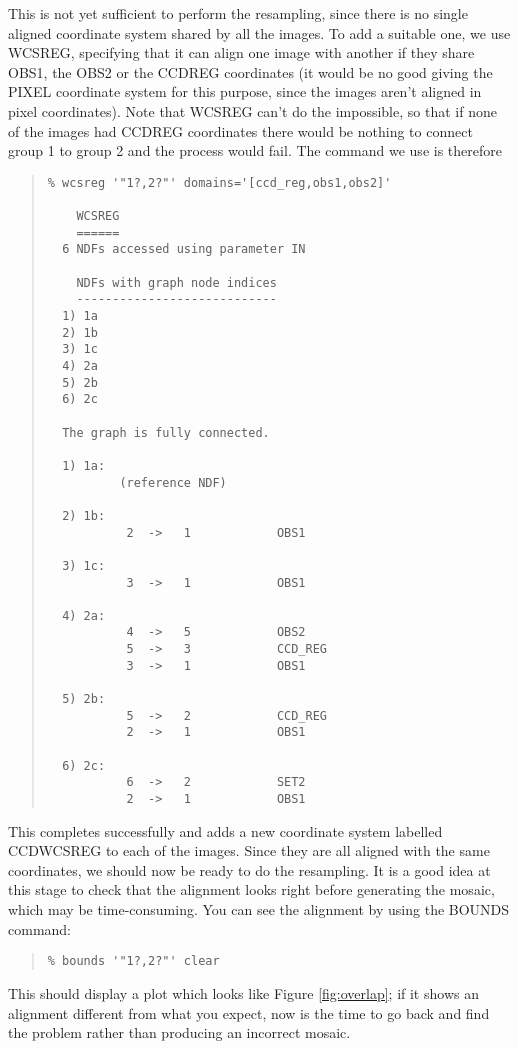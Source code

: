 \documentclass[twoside,11pt]{article}
\newcommand{\hyperref}[4]{#2\ref{#4}#3}
\newcommand{\htmlref}[2]{#1}
\renewcommand{\_}{\texttt{\symbol{95}}}
\newenvironment{myquote}{\begin{quote}\begin{small}}{\end{small}\end{quote}}
\newcommand{\routine}[1]{{\sc #1}}
\newcommand{\xroutine}[1]{\htmlref{{\sc #1}}{#1}}
\begin{document}
This is not yet sufficient to perform the resampling,
since there is no single aligned coordinate system shared by all the images.
To add a suitable one, we use \xroutine{WCSREG},
specifying that it can align one image with another if they share
OBS1, the OBS2 or the CCD\_REG coordinates (it would be no good
giving the PIXEL coordinate system for this purpose, since the images aren't
aligned in pixel coordinates).
Note that \routine{WCSREG} can't do the impossible, so that if
none of the images had CCD\_REG coordinates there would be nothing
to connect group 1 to group 2 and the process would fail.
The command we use is therefore
\begin{myquote}
\begin{verbatim}
% wcsreg '"1?,2?"' domains='[ccd_reg,obs1,obs2]'

    WCSREG
    ======
  6 NDFs accessed using parameter IN

    NDFs with graph node indices
    ----------------------------
  1) 1a
  2) 1b
  3) 1c
  4) 2a
  5) 2b
  6) 2c

  The graph is fully connected.

  1) 1a:
          (reference NDF)

  2) 1b:
           2  ->   1            OBS1

  3) 1c:
           3  ->   1            OBS1

  4) 2a:
           4  ->   5            OBS2
           5  ->   3            CCD_REG
           3  ->   1            OBS1

  5) 2b:
           5  ->   2            CCD_REG
           2  ->   1            OBS1

  6) 2c:
           6  ->   2            SET2
           2  ->   1            OBS1
\end{verbatim}
\end{myquote}
This completes successfully and adds a new coordinate system
labelled CCD\_WCSREG to each of the images.
Since they are all aligned with the same coordinates, we should now be
ready to do the resampling.
It is a good idea at this stage to check that the alignment looks right
before generating the mosaic, which may be time-consuming.
You can see the alignment by using the \xroutine{BOUNDS}
command:
\begin{myquote}
\begin{verbatim}
% bounds '"1?,2?"' clear
\end{verbatim}
\end{myquote}
This should display a plot which looks like 
\hyperref{the above figure}{Figure }{}{fig:overlap};
if it shows an alignment different from what you expect, 
now is the time to go back
and find the problem rather than producing an incorrect mosaic.
\end{document}
